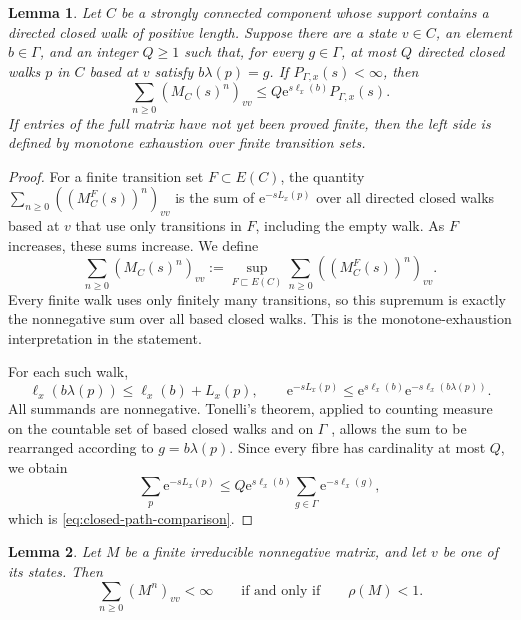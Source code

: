 \documentclass[11pt]{article}
\newtheorem{lemma}[lemma]{Lemma}
\theoremstyle{definition}
\newcommand{\e}{\mathrm e}
\begin{document}
\begin{lemma}
\label{lem:closed-path-comparison}
Let $C$ be a strongly connected component whose support contains a directed closed walk of
positive length.  Suppose there are a state $v\in C$, an element $b\in\Gamma$, and an integer
$Q\ge1$ such that, for every $g\in\Gamma$, at most $Q$ directed closed walks $p$
in $C$ based at $v$ satisfy $b\lambda(p)=g$.  If $P_{\Gamma,x}(s)<\infty$, then
\begin{equation}\label{eq:closed-path-comparison}
 \sum_{n\ge0}(M_C(s)^n)_{vv}
 \le Q\e^{s\ell_x(b)}P_{\Gamma,x}(s).
\end{equation}
If entries of the full matrix have not yet been proved finite, then the left side is defined by
monotone exhaustion over finite transition sets.
\end{lemma}

\begin{proof}
For a finite transition set $F\subset E(C)$, the quantity
$\sum_{n\ge0}((M_C^F(s))^n)_{vv}$ is the sum of $\e^{-sL_x(p)}$ over all directed
closed walks based at $v$ that use only transitions in $F$, including the empty walk.  As
$F$ increases, these sums increase.  We define
\[
 \sum_{n\ge0}(M_C(s)^n)_{vv}
 :=\sup_{F\sqsubset E(C)}\sum_{n\ge0}((M_C^F(s))^n)_{vv}.
\]
Every finite walk uses only finitely many transitions, so this supremum is exactly the
nonnegative sum over all based closed walks.  This is the monotone-exhaustion
interpretation in the statement.

For each such walk,
\[
 \ell_x(b\lambda(p))\le\ell_x(b)+L_x(p),
 \qquad
 \e^{-sL_x(p)}\le
 \e^{s\ell_x(b)}\e^{-s\ell_x(b\lambda(p))}.
\]
All summands are nonnegative.  Tonelli's theorem, applied to
counting measure on the countable set of based closed walks and on
\(\Gamma\)
\cite[Theorem~2.37, p.~67]{FollandRealAnalysis},
allows the sum to be rearranged according to
\(g=b\lambda(p)\).  Since every fibre has cardinality at most \(Q\),
we obtain\[
 \sum_p\e^{-sL_x(p)}
 \le Q\e^{s\ell_x(b)}\sum_{g\in\Gamma}\e^{-s\ell_x(g)},
\]
which is \eqref{eq:closed-path-comparison}.
\end{proof}

\begin{lemma}
\label{lem:loop-series}
Let $M$ be a finite irreducible nonnegative matrix, and let $v$ be one of its states.  Then
\[
 \sum_{n\ge0}(M^n)_{vv}<\infty
 \qquad\mbox{if and only if}\qquad
 \rho(M)<1.
\]
\end{lemma}
\end{document}
